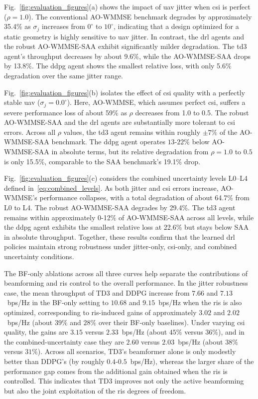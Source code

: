 Fig.~\ref{fig:evaluation_figures}(a) shows the impact of \gls{uav} jitter when \gls{csi} is perfect ($\rho = 1.0$). The conventional AO-WMMSE benchmark degrades by approximately 35.4\% as $\sigma_j$ increases from $0^\circ$ to $10^\circ$, indicating that a design optimized for a static geometry is highly sensitive to \gls{uav} jitter. In contrast, the \gls{drl} agents and the robust AO-WMMSE-SAA exhibit significantly milder degradation. The \gls{td3} agent’s throughput decreases by about 9.6\%, while the AO-WMMSE-SAA drops by 13.8\%. The \gls{ddpg} agent shows the smallest relative loss, with only 5.6\% degradation over the same jitter range.

Fig.~\ref{fig:evaluation_figures}(b) isolates the effect of \gls{csi} quality with a perfectly stable \gls{uav} ($\sigma_j = 0.0^\circ$). Here, AO-WMMSE, which assumes perfect \gls{csi}, suffers a severe performance loss of about 59\% as $\rho$ decreases from 1.0 to 0.5. The robust AO-WMMSE-SAA and the \gls{drl} agents are substantially more tolerant to \gls{csi} errors. Across all $\rho$ values, the \gls{td3} agent remains within roughly $\pm 7\%$ of the AO-WMMSE-SAA benchmark. The \gls{ddpg} agent operates $13$-$22\%$ below AO-WMMSE-SAA in absolute terms, but its relative degradation from $\rho=1.0$ to $0.5$ is only 15.5\%, comparable to the SAA benchmark’s 19.1\% drop.

Fig.~\ref{fig:evaluation_figures}(c) considers the combined uncertainty levels L0--L4 defined in~\eqref{eq:combined_levels}. As both jitter and \gls{csi} errors increase, AO-WMMSE’s performance collapses, with a total degradation of about 64.7\% from L0 to L4. The robust AO-WMMSE-SAA degrades by 29.4\%. The \gls{td3} agent remains within approximately 0-12\% of AO-WMMSE-SAA across all levels, while the \gls{ddpg} agent exhibits the smallest relative loss at 22.6\% but stays below SAA in absolute throughput. Together, these results confirm that the learned \gls{drl} policies maintain strong robustness under jitter-only, \gls{csi}-only, and combined uncertainty conditions.

The BF-only ablations across all three curves help separate the contributions of beamforming and \gls{ris} control to the overall performance. In the jitter robustness case, the mean throughput of TD3 and DDPG increase from $7.66$ and $7.13$~bps/Hz in the BF-only setting to $10.68$ and $9.15$~bps/Hz when the \gls{ris} is also optimized, corresponding to \gls{ris}-induced gains of approximately $3.02$ and $2.02$~bps/Hz (about $39\%$ and $28\%$ over their BF-only baselines). Under varying \gls{csi} quality, the gains are $3.15$ versus $2.33$~bps/Hz (about $45\%$ versus $36\%$), and in the combined-uncertainty case they are $2.60$ versus $2.03$~bps/Hz (about $38\%$ versus $31\%$). Across all scenarios, TD3’s beamformer alone is only modestly better than DDPG’s (by roughly $0.4$-$0.5$~bps/Hz), whereas the larger share of the performance gap comes from the additional gain obtained when the \gls{ris} is controlled. This indicates that TD3 improves not only the active beamforming but also the joint exploitation of the \gls{ris} degrees of freedom.
